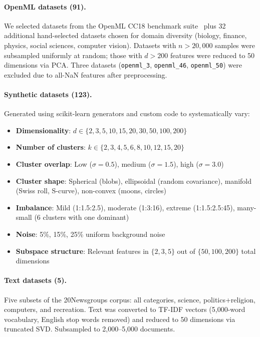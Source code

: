 \documentclass[10pt]{article} %
\begin{document}
\paragraph{OpenML datasets (91).}
We selected datasets from the OpenML CC18 benchmark suite~\citep{bischl2016aslib} plus 32 additional hand-selected datasets chosen for domain diversity (biology, finance, physics, social sciences, computer vision). Datasets with $n > 20{,}000$ samples were subsampled uniformly at random; those with $d > 200$ features were reduced to 50 dimensions via PCA. Three datasets (\texttt{openml\_3}, \texttt{openml\_46}, \texttt{openml\_50}) were excluded due to all-NaN features after preprocessing.

\paragraph{Synthetic datasets (123).}
Generated using scikit-learn generators and custom code to systematically vary:
\begin{itemize}
    \item \textbf{Dimensionality}: $d \in \{2, 3, 5, 10, 15, 20, 30, 50, 100, 200\}$
    \item \textbf{Number of clusters}: $k \in \{2, 3, 4, 5, 6, 8, 10, 12, 15, 20\}$
    \item \textbf{Cluster overlap}: Low ($\sigma=0.5$), medium ($\sigma=1.5$), high ($\sigma=3.0$)
    \item \textbf{Cluster shape}: Spherical (blobs), ellipsoidal (random covariance), manifold (Swiss roll, S-curve), non-convex (moons, circles)
    \item \textbf{Imbalance}: Mild (1:1.5:2.5), moderate (1:3:16), extreme (1:1.5:2.5:45), many-small (6 clusters with one dominant)
    \item \textbf{Noise}: 5\%, 15\%, 25\% uniform background noise
    \item \textbf{Subspace structure}: Relevant features in $\{2, 3, 5\}$ out of $\{50, 100, 200\}$ total dimensions
\end{itemize}

\paragraph{Text datasets (5).}
Five subsets of the 20Newsgroups corpus: all categories, science, politics+religion, computers, and recreation. Text was converted to TF-IDF vectors (5,000-word vocabulary, English stop words removed) and reduced to 50 dimensions via truncated SVD. Subsampled to 2,000--5,000 documents.
\end{document}
